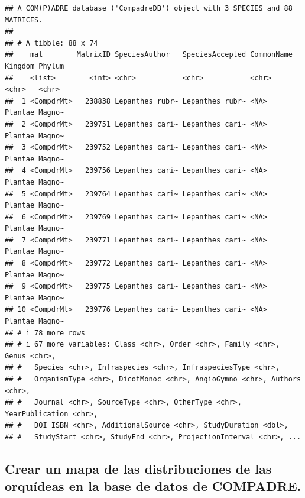 \documentclass[
]{book}
\newenvironment{Shaded}{\begin{snugshade}}{\end{snugshade}}
\newcommand{\AttributeTok}[1]{\textcolor[rgb]{0.13,0.29,0.53}{#1}}
\newcommand{\FunctionTok}[1]{\textcolor[rgb]{0.13,0.29,0.53}{\textbf{#1}}}
\newcommand{\NormalTok}[1]{#1}
\newcommand{\SpecialCharTok}[1]{\textcolor[rgb]{0.81,0.36,0.00}{\textbf{#1}}}
\newcommand{\StringTok}[1]{\textcolor[rgb]{0.31,0.60,0.02}{#1}}
\theoremstyle{definition}
\theoremstyle{definition}
\theoremstyle{definition}
\theoremstyle{definition}
\theoremstyle{remark}
\begin{document}
\begin{verbatim}
## A COM(P)ADRE database ('CompadreDB') object with 3 SPECIES and 88 MATRICES.
## 
## # A tibble: 88 x 74
##    mat        MatrixID SpeciesAuthor   SpeciesAccepted CommonName Kingdom Phylum
##    <list>        <int> <chr>           <chr>           <chr>      <chr>   <chr> 
##  1 <CompdrMt>   238838 Lepanthes_rubr~ Lepanthes rubr~ <NA>       Plantae Magno~
##  2 <CompdrMt>   239751 Lepanthes_cari~ Lepanthes cari~ <NA>       Plantae Magno~
##  3 <CompdrMt>   239752 Lepanthes_cari~ Lepanthes cari~ <NA>       Plantae Magno~
##  4 <CompdrMt>   239756 Lepanthes_cari~ Lepanthes cari~ <NA>       Plantae Magno~
##  5 <CompdrMt>   239764 Lepanthes_cari~ Lepanthes cari~ <NA>       Plantae Magno~
##  6 <CompdrMt>   239769 Lepanthes_cari~ Lepanthes cari~ <NA>       Plantae Magno~
##  7 <CompdrMt>   239771 Lepanthes_cari~ Lepanthes cari~ <NA>       Plantae Magno~
##  8 <CompdrMt>   239772 Lepanthes_cari~ Lepanthes cari~ <NA>       Plantae Magno~
##  9 <CompdrMt>   239775 Lepanthes_cari~ Lepanthes cari~ <NA>       Plantae Magno~
## 10 <CompdrMt>   239776 Lepanthes_cari~ Lepanthes cari~ <NA>       Plantae Magno~
## # i 78 more rows
## # i 67 more variables: Class <chr>, Order <chr>, Family <chr>, Genus <chr>,
## #   Species <chr>, Infraspecies <chr>, InfraspeciesType <chr>,
## #   OrganismType <chr>, DicotMonoc <chr>, AngioGymno <chr>, Authors <chr>,
## #   Journal <chr>, SourceType <chr>, OtherType <chr>, YearPublication <chr>,
## #   DOI_ISBN <chr>, AdditionalSource <chr>, StudyDuration <dbl>,
## #   StudyStart <chr>, StudyEnd <chr>, ProjectionInterval <chr>, ...
\end{verbatim}

\subsection{Crear un mapa de las distribuciones de las orquídeas en la base de datos de COMPADRE.}\label{crear-un-mapa-de-las-distribuciones-de-las-orquuxeddeas-en-la-base-de-datos-de-compadre.}

\begin{Shaded}
\end{Shaded}
\end{document}
